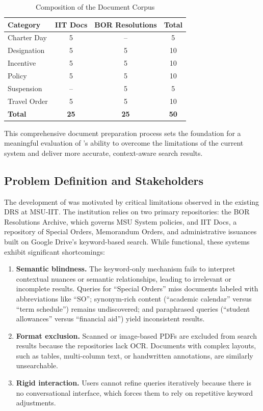 \begin{table}[htbp]
  \centering
  \caption{Composition of the Document Corpus}\label{tab:corpus}
  \begin{tabular}{@{}lccc@{}}
    \toprule
    \textbf{Category} & \textbf{IIT Docs} & \textbf{BOR Resolutions} & \textbf{Total} \\
    \midrule
    Charter Day   & 5 & -- & 5 \\
    Designation   & 5 & 5  & 10 \\
    Incentive     & 5 & 5  & 10 \\
    Policy        & 5 & 5  & 10 \\
    Suspension    & -- & 5 & 5 \\
    Travel Order  & 5 & 5  & 10 \\
    \midrule
    \textbf{Total} & \textbf{25} & \textbf{25} & \textbf{50} \\
    \bottomrule
  \end{tabular}
\end{table}

This comprehensive document preparation process sets the foundation for a meaningful evaluation of \cs{}'s ability to overcome the limitations of the current system and deliver more accurate, context-aware search results.

\subsection{Problem Definition and Stakeholders}

The development of \cs{} was motivated by critical limitations observed in the existing DRS at MSU-IIT. The institution relies on two primary repositories: the BOR Resolutions Archive, which governs MSU System policies, and IIT Docs, a repository of Special Orders, Memorandum Orders, and administrative issuances built on Google Drive's keyword-based search. While functional, these systems exhibit significant shortcomings:

\begin{enumerate}
  \item \textbf{Semantic blindness.} The keyword-only mechanism fails to interpret contextual nuances or semantic relationships, leading to irrelevant or incomplete results. Queries for ``Special Orders'' miss documents labeled with abbreviations like ``SO''; synonym-rich content (``academic calendar'' versus ``term schedule'') remains undiscovered; and paraphrased queries (``student allowances'' versus ``financial aid'') yield inconsistent results.
  \item \textbf{Format exclusion.} Scanned or image-based PDFs are excluded from search results because the repositories lack OCR. Documents with complex layouts, such as tables, multi-column text, or handwritten annotations, are similarly unsearchable.
  \item \textbf{Rigid interaction.} Users cannot refine queries iteratively because there is no conversational interface, which forces them to rely on repetitive keyword adjustments.
\end{enumerate}

